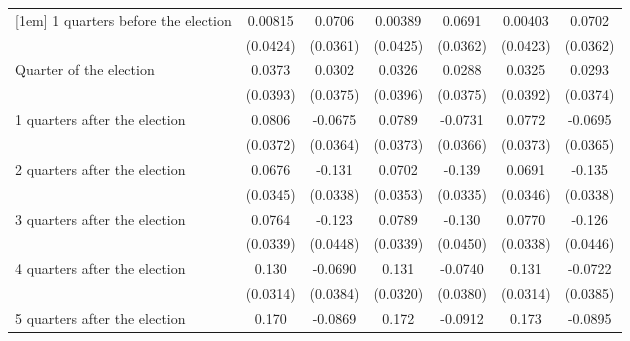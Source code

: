 \begin{table}[htbp]
\begin{tabular}{l*{6}{c}}
[1em]
 1 quarters before the election&     0.00815         &      0.0706         &     0.00389         &      0.0691         &     0.00403         &      0.0702         \\
                    &    (0.0424)         &    (0.0361)         &    (0.0425)         &    (0.0362)         &    (0.0423)         &    (0.0362)         \\
[1em]
Quarter of the election&      0.0373         &      0.0302         &      0.0326         &      0.0288         &      0.0325         &      0.0293         \\
                    &    (0.0393)         &    (0.0375)         &    (0.0396)         &    (0.0375)         &    (0.0392)         &    (0.0374)         \\
[1em]
 1 quarters after the election&      0.0806\sym{*}  &     -0.0675         &      0.0789\sym{*}  &     -0.0731\sym{*}  &      0.0772\sym{*}  &     -0.0695         \\
                    &    (0.0372)         &    (0.0364)         &    (0.0373)         &    (0.0366)         &    (0.0373)         &    (0.0365)         \\
[1em]
 2 quarters after the election&      0.0676         &      -0.131\sym{***}&      0.0702\sym{*}  &      -0.139\sym{***}&      0.0691\sym{*}  &      -0.135\sym{***}\\
                    &    (0.0345)         &    (0.0338)         &    (0.0353)         &    (0.0335)         &    (0.0346)         &    (0.0338)         \\
[1em]
 3 quarters after the election&      0.0764\sym{*}  &      -0.123\sym{**} &      0.0789\sym{*}  &      -0.130\sym{**} &      0.0770\sym{*}  &      -0.126\sym{**} \\
                    &    (0.0339)         &    (0.0448)         &    (0.0339)         &    (0.0450)         &    (0.0338)         &    (0.0446)         \\
[1em]
 4 quarters after the election&       0.130\sym{***}&     -0.0690         &       0.131\sym{***}&     -0.0740         &       0.131\sym{***}&     -0.0722         \\
                    &    (0.0314)         &    (0.0384)         &    (0.0320)         &    (0.0380)         &    (0.0314)         &    (0.0385)         \\
[1em]
 5 quarters after the election&       0.170\sym{***}&     -0.0869\sym{*}  &       0.172\sym{***}&     -0.0912\sym{**} &       0.173\sym{***}&     -0.0895\sym{*}  \\

\end{tabular}
\end{table}
